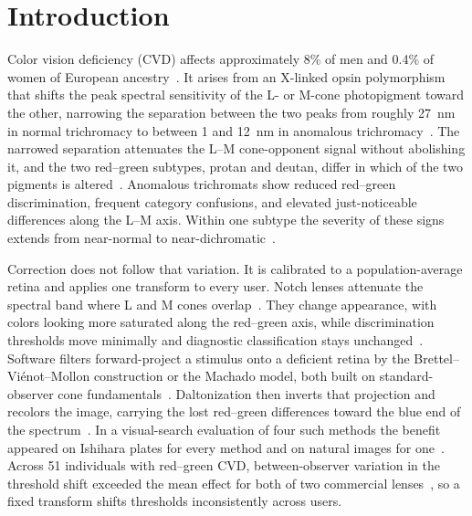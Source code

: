 \section{Introduction}
\label{sec:intro}

Color vision deficiency (CVD) affects approximately 8\% of men and 0.4\% of women of European ancestry~\citep{birch2012}. It arises from an X-linked opsin polymorphism that shifts the peak spectral sensitivity of the L- or M-cone photopigment toward the other, narrowing the separation between the two peaks from roughly 27~nm in normal trichromacy to between 1 and 12~nm in anomalous trichromacy~\citep{deeb2005, neitz2011, bosten2019}. The narrowed separation attenuates the L--M cone-opponent signal without abolishing it, and the two red--green subtypes, protan and deutan, differ in which of the two pigments is altered~\citep{neitz2011}. Anomalous trichromats show reduced red--green discrimination, frequent category confusions, and elevated just-noticeable differences along the L--M axis. Within one subtype the severity of these signs extends from near-normal to near-dichromatic~\citep{bosten2019, neitz2011}.

Correction does not follow that variation. It is calibrated to a population-average retina and applies one transform to every user. Notch lenses attenuate the spectral band where L and M cones overlap~\citep{alvaro2022, gomezrobledo2018}. They change appearance, with colors looking more saturated along the red--green axis, while discrimination thresholds move minimally and diagnostic classification stays unchanged~\citep{somers2024, gomezrobledo2018, alvaro2022}. Software filters forward-project a stimulus onto a deficient retina by the Brettel--Vi\'enot--Mollon construction or the Machado model, both built on standard-observer cone fundamentals~\citep{brettel1997, machado2009}. Daltonization then inverts that projection and recolors the image, carrying the lost red--green differences toward the blue end of the spectrum~\citep{fidaner2005}. In a visual-search evaluation of four such methods the benefit appeared on Ishihara plates for every method and on natural images for one~\citep{simonliedtke2016}. Across 51 individuals with red--green CVD, between-observer variation in the threshold shift exceeded the mean effect for both of two commercial lenses~\citep{patterson2022}, so a fixed transform shifts thresholds inconsistently across users.

